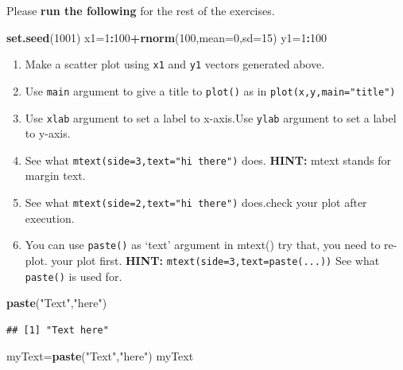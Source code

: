 \documentclass[12pt,]{krantz}
\newenvironment{Shaded}{\begin{snugshade}}{\end{snugshade}}
\newcommand{\DataTypeTok}[1]{\textcolor[rgb]{0.13,0.29,0.53}{#1}}
\newcommand{\DecValTok}[1]{\textcolor[rgb]{0.00,0.00,0.81}{#1}}
\newcommand{\KeywordTok}[1]{\textcolor[rgb]{0.13,0.29,0.53}{\textbf{#1}}}
\newcommand{\NormalTok}[1]{#1}
\newcommand{\OperatorTok}[1]{\textcolor[rgb]{0.81,0.36,0.00}{\textbf{#1}}}
\newcommand{\StringTok}[1]{\textcolor[rgb]{0.31,0.60,0.02}{#1}}
\begin{document}
Please \textbf{run the following} for the rest of the exercises.

\begin{Shaded}
\begin{Highlighting}[]
\KeywordTok{set.seed}\NormalTok{(}\DecValTok{1001}\NormalTok{)}
\NormalTok{x1=}\DecValTok{1}\OperatorTok{:}\DecValTok{100}\OperatorTok{+}\KeywordTok{rnorm}\NormalTok{(}\DecValTok{100}\NormalTok{,}\DataTypeTok{mean=}\DecValTok{0}\NormalTok{,}\DataTypeTok{sd=}\DecValTok{15}\NormalTok{)}
\NormalTok{y1=}\DecValTok{1}\OperatorTok{:}\DecValTok{100}
\end{Highlighting}
\end{Shaded}

\begin{enumerate}
\def\labelenumi{\arabic{enumi}.}
\setcounter{enumi}{43}
\item
  Make a scatter plot using \texttt{x1} and \texttt{y1} vectors generated above.
\item
  Use \texttt{main} argument to give a title to \texttt{plot()} as in \texttt{plot(x,y,main="title")}
\item
  Use \texttt{xlab} argument to set a label to x-axis.Use \texttt{ylab} argument to set a label to y-axis.
\item
  See what \texttt{mtext(side=3,text="hi\ there")} does. \textbf{HINT:} mtext stands for margin text.
\item
  See what \texttt{mtext(side=2,text="hi\ there")} does.check your plot after execution.
\item
  You can use \texttt{paste()} as `text' argument in mtext() try that, you need to re-plot.
  your plot first. \textbf{HINT:} \texttt{mtext(side=3,text=paste(...))}
  See what \texttt{paste()} is used for.
\end{enumerate}

\begin{Shaded}
\begin{Highlighting}[]
\KeywordTok{paste}\NormalTok{(}\StringTok{"Text"}\NormalTok{,}\StringTok{"here"}\NormalTok{)}
\end{Highlighting}
\end{Shaded}

\begin{verbatim}
## [1] "Text here"
\end{verbatim}

\begin{Shaded}
\begin{Highlighting}[]
\NormalTok{myText=}\KeywordTok{paste}\NormalTok{(}\StringTok{"Text"}\NormalTok{,}\StringTok{"here"}\NormalTok{)}
\NormalTok{myText}
\end{Highlighting}
\end{Shaded}
\end{document}
